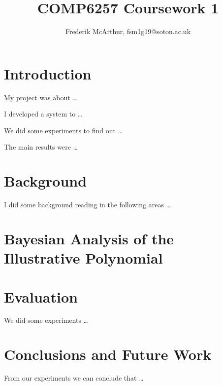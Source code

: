 \documentclass[a4paper, 11pt]{article}
\title{COMP6257 Coursework 1}
\author{Frederik McArthur, fsm1g19@soton.ac.uk}
\begin{document}
\maketitle
\tableofcontents

\section{Introduction}

My project was about \ldots

I developed a system to \ldots

We did some experiments to find out \ldots

The main results were \ldots

\pagebreak

\section{Background}

I did some background reading in the following areas \ldots

\pagebreak

\section{Bayesian Analysis of the Illustrative Polynomial}



\pagebreak

\section{Evaluation}

We did some experiments \ldots

\pagebreak

\section{Conclusions and Future Work}

From our experiments we can conclude that \ldots


\end{document}
